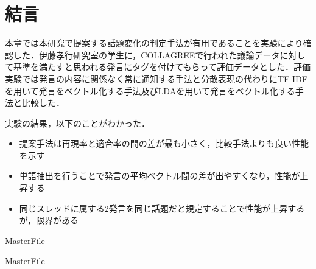\section{結言}
\label{exp:conclusion}
本章では本研究で提案する話題変化の判定手法が有用であることを実験により確認した．伊藤孝行研究室の学生に，COLLAGREEで行われた議論データに対して基準を満たすと思われる発言にタグを付けてもらって評価データとした．評価実験では発言の内容に関係なく常に通知する手法と分散表現の代わりにTF-IDFを用いて発言をベクトル化する手法及びLDAを用いて発言をベクトル化する手法と比較した．

実験の結果，以下のことがわかった．
\begin{itemize}
  \item 提案手法は再現率と適合率の間の差が最も小さく，比較手法よりも良い性能を示す
  \item 単語抽出を行うことで発言の平均ベクトル間の差が出やすくなり，性能が上昇する
  \item 同じスレッドに属する2発言を同じ話題だと規定することで性能が上昇するが，限界がある
\end{itemize}

 \expandafter\ifx\csname MasterFile\endcsname\relax
	\def\BibFile{hoge}
	
  \fi
  \expandafter\ifx\csname MasterFile\endcsname\relax

\fi
